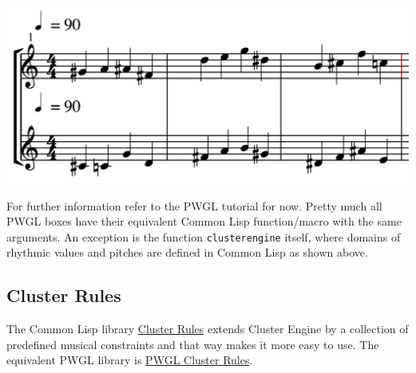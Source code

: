\begin{center}
\includegraphics[width=.9\linewidth]{graphics/polyphonic-solution.jpg}
\end{center}


For further information refer to the PWGL tutorial for now. Pretty much all PWGL boxes have their equivalent Common Lisp function/macro with the same arguments. An exception is the function \texttt{clusterengine} itself, where domains of rhythmic values and pitches are defined in Common Lisp as shown above. 


\subsection*{Cluster Rules}
\label{sec:orgdd64122}

The Common Lisp library \href{https://github.com/tanders/cluster-rules}{Cluster Rules} extends Cluster Engine by a collection of predefined musical constraints and that way makes it more easy to use. The equivalent PWGL library is \href{https://github.com/tanders/pwgl-cluster-rules}{PWGL Cluster Rules}. 
